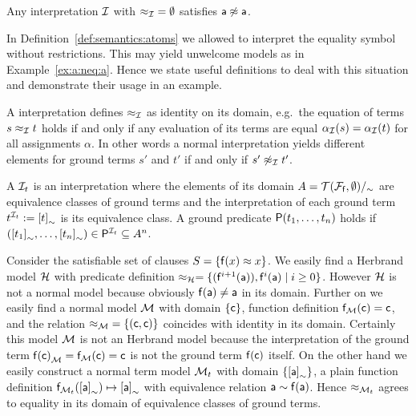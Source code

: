 \begin{example}\label{ex:a:neq:a}
	Any interpretation \( \mathcal{I} \)
	with \( {\approx_{\mathcal{I}}} = \emptyset \) satisfies \( \mathsf{a}\not\approx\mathsf{a} \).
\end{example}

\noindent In Definition~\vref{def:semantics:atoms} we allowed
to interpret the equality symbol without restrictions.
This may yield unwelcome models as in Example~\vref{ex:a:neq:a}.
Hence we state useful definitions to deal with this situation
and demonstrate their usage in an example.


\begin{definition}\label{def:normal:interpreation}
	A  interpretation defines \( \approx_{\mathcal{I}} \) as identity on its domain,
	e.g.~the equation of terms \( s \approx_{\mathcal{I}} t \) holds if and only
	if any evaluation of its terms are equal \( \alpha_{\mathcal{I}}(s) = \alpha_{\mathcal{I}}(t) \)
	for all assignments \( \alpha \).
	In other words a normal interpretation yields different elements
	for ground terms \( s' \) and \( t' \) if and only if \( s'\not\approx_{\mathcal{I}} t' \).
\end{definition}

\begin{definition}
	A 
	\( \mathcal{I}_t \)
	is an interpretation
	where the elements of its domain \( A = {\mathcal{T}(\mathcal{F}_{\mathsf{f}},\emptyset)}/_\sim \)
	are equivalence classes of ground terms
	and the interpretation of each ground term \( t^{\mathcal{I}_t} := {[t]}_\sim \) is its equivalence class.
	A ground predicate \( \mathsf{P}(t_1,\ldots,t_n) \) holds if
	\( ({[t_1]}_\sim,\ldots,{[t_n]}_\sim) \in \mathsf{P}^{\mathcal{I}_t} \subseteq A^n \).
\end{definition}


\begin{example}
	Consider the satisfiable set of clauses \( S = \{ \mathsf{f}(x) \approx x \} \).
	We easily find a Herbrand model \( \mathcal{H} \) with
	predicate definition
	\( \approx_{\mathcal{H}} = \{ (\mathsf{f}^{i+1}(\mathsf{a})), \mathsf{f}^{i}(\mathsf{a}) \mid i\geq 0  \}  \).
	However \( \mathcal{H} \) is not a normal model because obviously \( \mathsf{f}(\mathsf{a})\neq\mathsf{a} \) in its domain.
	Further on we easily find a normal model \( \mathcal{M} \)
	with domain \( \{ \mathsf{c} \} \), function definition \( \mathsf{f}_{\mathcal{M}}(\mathsf{c}) = \mathsf{c} \),
	and the relation \( {\approx_{\mathcal{M}}} = \{ (\mathsf{c},\mathsf{c})\} \) coincides with identity in its domain.
	Certainly this model \( \mathcal{M} \) is not an Herbrand model
	because the interpretation of the ground term \( {\mathsf{f}(\mathsf{c})}_{\mathcal{M}} = \mathsf{f}_{\mathcal{M}}(\mathsf{c})=\mathsf{c} \) is not the ground term \( \mathsf{f}(\mathsf{c}) \) itself.
	On the other hand we easily construct a normal term model
	\( \mathcal{M}_t \) with domain \( \{ {[\mathsf{a}]}_\sim \} \),
	a plain function definition
	\( \mathsf{f}_{\mathcal{M}_t}({[\mathsf{a}]}_\sim) \mapsto {[\mathsf{a}]}_\sim \)
	with equivalence relation
	\( \mathsf{a} \sim \mathsf{f}(\mathsf{a}) \).
	Hence \( \approx_{\mathcal{M}_t} \) agrees to equality in its domain of equivalence classes of ground terms.
\end{example}

